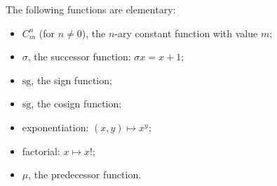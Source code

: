 The following functions are elementary:
\begin{itemize}
\item[(i)] $C_m^n$ (for $n \neq 0$), the $n$-ary constant function with value $m$;
\item[(ii)] $\sigma$, the successor function: $\sigma x = x + 1$;
\item[(iii)] $\text{sg}$, the sign function;
\item[(iv)] $\overline{\text{sg}}$, the cosign function;
\item[(v)] exponentiation: $(x,y) \mapsto x^y$;
\item[(vi)] factorial: $x \mapsto x!$;
\item[(vii)] $\mu$, the predecessor function.
\end{itemize}
